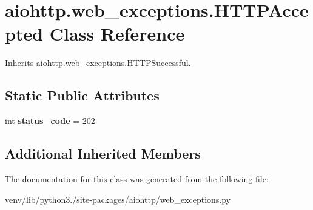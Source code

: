 \hypertarget{classaiohttp_1_1web__exceptions_1_1_h_t_t_p_accepted}{}\section{aiohttp.\+web\+\_\+exceptions.\+H\+T\+T\+P\+Accepted Class Reference}
\label{classaiohttp_1_1web__exceptions_1_1_h_t_t_p_accepted}


Inherits \hyperlink{classaiohttp_1_1web__exceptions_1_1_h_t_t_p_successful}{aiohttp.\+web\+\_\+exceptions.\+H\+T\+T\+P\+Successful}.

\subsection*{Static Public Attributes}
\begin{DoxyCompactItemize}
\item 
\mbox{\label{classaiohttp_1_1web__exceptions_1_1_h_t_t_p_accepted_a7ac9269461deef2e0c5e555bfa7da840}} 
int {\bfseries status\+\_\+code} = 202
\end{DoxyCompactItemize}
\subsection*{Additional Inherited Members}


The documentation for this class was generated from the following file\+:\begin{DoxyCompactItemize}
\item 
venv/lib/python3./site-\/packages/aiohttp/web\+\_\+exceptions.\+py\end{DoxyCompactItemize}
